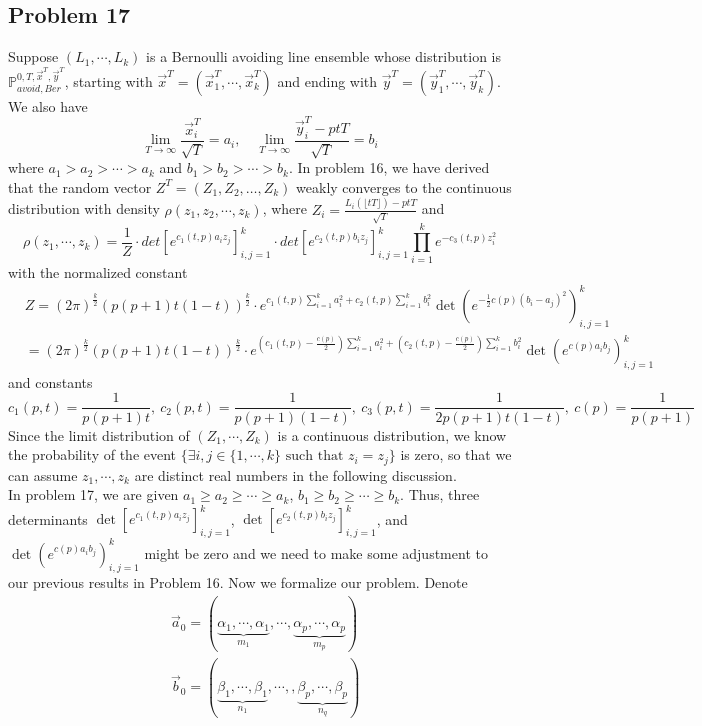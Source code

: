 \documentclass[12pt]{article}
\begin{document}
\subsection*{Problem 17}
Suppose $(L_{1},\cdots,L_{k})$ is a Bernoulli avoiding line ensemble whose distribution is $\mathbb{P}_{avoid, Ber}^{0,T,\vec{x}^{T},\vec{y}^{T}}$, starting with $\vec{x}^{T}=(\vec{x}^{T}_{1},\cdots,\vec{x}^{T}_{k})$ and ending with $\vec{y}^{T}=(\vec{y}^{T}_{1},\cdots,\vec{y}^{T}_{k})$. We also have $$\lim_{T\rightarrow\infty}\frac{\vec{x}_{i}^{T}}{\sqrt{T}}=a_{i}, \quad\lim_{T\rightarrow\infty}\frac{\vec{y}_{i}^{T}-ptT}{\sqrt{T}}=b_{i}$$ where $a_{1}>a_{2}>\cdots> a_{k}$ and $b_{1}>b_{2}>\cdots> b_{k}$. In problem 16, we have derived that the random vector $Z^{T}=(Z_{1},Z_{2},\dots,Z_{k})$ weakly converges to the continuous distribution with density $\rho(z_{1},z_{2},\cdots,z_{k})$, where $Z_{i}=\frac{L_{i}(\lfloor tT \rfloor)-ptT}{\sqrt{T}}$ and 
$$\rho(z_{1},\cdots,z_{k})=\frac{1}{Z}\cdot det[e^{c_1(t,p)a_{i}z_{j}}]_{i,j=1}^{k}\cdot det[e^{c_2(t,p)b_{i}z_{j}}]_{i,j=1}^{k}\prod_{i=1}^{k}e^{-c_{3}(t,p)z_{i}^{2}}$$ with the normalized constant 
\begin{align*}
	&Z=(2\pi)^{\frac{k}{2}}(p(p+1)t(1-t))^{\frac{k}{2}}\cdot e^{c_{1}(t,p)\sum_{i=1}^{k}a_{i}^{2}+c_{2}(t,p)\sum_{i=1}^{k}b_{i}^{2}} \det(e^{-\frac{1}{2}c(p)(b_{i}-a_{j})^{2}})_{i,j=1}^{k}\\
	& =(2\pi)^{\frac{k}{2}}(p(p+1)t(1-t))^{\frac{k}{2}}\cdot e^{(c_{1}(t,p)-\frac{c(p)}{2})\sum_{i=1}^{k}a_{i}^{2}+(c_{2}(t,p)-\frac{c(p)}{2})\sum_{i=1}^{k}b_{i}^{2}}\det(e^{c(p)a_{i}b_{j}})_{i,j=1}^{k}
\end{align*}
and constants $$c_{1}(p,t)=\frac{1}{p(p+1)t},\ c_{2}(p,t)=\frac{1}{p(p+1)(1-t)},\ c_{3}(p,t)=\frac{1}{2p(p+1)t(1-t)},\ c(p)=\frac{1}{p(p+1)}$$
Since the limit distribution of $(Z_{1},\cdots,Z_{k})$ is a continuous distribution, we know the probability of the event $\{\exists i,j\in\{1,\cdots,k \}\text{ such that }z_{i}=z_{j}\}$ is zero, so that we can assume $z_{1},\cdots,z_{k}$ are distinct real numbers in the following discussion.\\
In problem 17, we are given $a_{1}\geqslant a_{2}\geqslant\cdots\geqslant a_{k}$, $b_{1}\geqslant b_{2}\geqslant\cdots\geqslant b_{k}$. Thus, three determinants $\det[e^{c_1(t,p)a_{i}z_{j}}]_{i,j=1}^{k}$, $\det[e^{c_2(t,p)b_{i}z_{j}}]_{i,j=1}^{k}$, and $\det(e^{c(p)a_{i}b_{j}})_{i,j=1}^{k}$ might be zero and we need to make some adjustment to our previous results in Problem 16. Now we formalize our problem.
Denote
\begin{align*}
	&\vec{a}_{0}=(\underbrace{\alpha_{1},\cdots,\alpha_{1}}_{m_{1}},\cdots,\underbrace{\alpha_{p},\cdots,\alpha_{p}}_{m_{p}})\\
	&\vec{b}_{0}=(\underbrace{\beta_{1},\cdots,\beta_{1}}_{n_{1}},\cdots,,\underbrace{\beta_{p},\cdots,\beta_{p}}_{n_{q}})
\end{align*}
\end{document}
